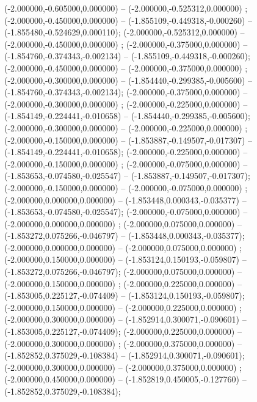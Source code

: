  (-2.000000,-0.605000,0.000000) -- (-2.000000,-0.525312,0.000000) ;
 (-2.000000,-0.450000,0.000000) -- (-1.855109,-0.449318,-0.000260) -- (-1.855480,-0.524629,0.000110);
 (-2.000000,-0.525312,0.000000) -- (-2.000000,-0.450000,0.000000) ;
 (-2.000000,-0.375000,0.000000) -- (-1.854760,-0.374343,-0.002134) -- (-1.855109,-0.449318,-0.000260);
 (-2.000000,-0.450000,0.000000) -- (-2.000000,-0.375000,0.000000) ;
 (-2.000000,-0.300000,0.000000) -- (-1.854440,-0.299385,-0.005600) -- (-1.854760,-0.374343,-0.002134);
 (-2.000000,-0.375000,0.000000) -- (-2.000000,-0.300000,0.000000) ;
 (-2.000000,-0.225000,0.000000) -- (-1.854149,-0.224441,-0.010658) -- (-1.854440,-0.299385,-0.005600);
 (-2.000000,-0.300000,0.000000) -- (-2.000000,-0.225000,0.000000) ;
 (-2.000000,-0.150000,0.000000) -- (-1.853887,-0.149507,-0.017307) -- (-1.854149,-0.224441,-0.010658);
 (-2.000000,-0.225000,0.000000) -- (-2.000000,-0.150000,0.000000) ;
 (-2.000000,-0.075000,0.000000) -- (-1.853653,-0.074580,-0.025547) -- (-1.853887,-0.149507,-0.017307);
 (-2.000000,-0.150000,0.000000) -- (-2.000000,-0.075000,0.000000) ;
 (-2.000000,0.000000,0.000000) -- (-1.853448,0.000343,-0.035377) -- (-1.853653,-0.074580,-0.025547);
 (-2.000000,-0.075000,0.000000) -- (-2.000000,0.000000,0.000000) ;
 (-2.000000,0.075000,0.000000) -- (-1.853272,0.075266,-0.046797) -- (-1.853448,0.000343,-0.035377);
 (-2.000000,0.000000,0.000000) -- (-2.000000,0.075000,0.000000) ;
 (-2.000000,0.150000,0.000000) -- (-1.853124,0.150193,-0.059807) -- (-1.853272,0.075266,-0.046797);
 (-2.000000,0.075000,0.000000) -- (-2.000000,0.150000,0.000000) ;
 (-2.000000,0.225000,0.000000) -- (-1.853005,0.225127,-0.074409) -- (-1.853124,0.150193,-0.059807);
 (-2.000000,0.150000,0.000000) -- (-2.000000,0.225000,0.000000) ;
 (-2.000000,0.300000,0.000000) -- (-1.852914,0.300071,-0.090601) -- (-1.853005,0.225127,-0.074409);
 (-2.000000,0.225000,0.000000) -- (-2.000000,0.300000,0.000000) ;
 (-2.000000,0.375000,0.000000) -- (-1.852852,0.375029,-0.108384) -- (-1.852914,0.300071,-0.090601);
 (-2.000000,0.300000,0.000000) -- (-2.000000,0.375000,0.000000) ;
 (-2.000000,0.450000,0.000000) -- (-1.852819,0.450005,-0.127760) -- (-1.852852,0.375029,-0.108384);
